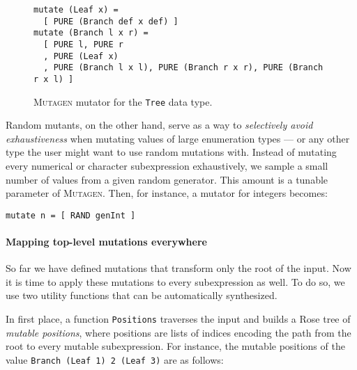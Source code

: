 \documentclass[sigconf, anonymous, review]{acmart}
\newcommand{\mutagen}{\textsc{Mutagen}\xspace}
\begin{document}
\begin{figure}[t]
\begin{verbatim}
mutate (Leaf x) =
  [ PURE (Branch def x def) ]
mutate (Branch l x r) =
  [ PURE l, PURE r
  , PURE (Leaf x)
  , PURE (Branch l x l), PURE (Branch r x r), PURE (Branch r x l) ]
\end{verbatim}
\vspace{-5pt}
\caption{\label{fig:mutagen:mutator}\mutagen mutator for the \texttt{Tree} data
  type.}
\vspace{-5pt}
\end{figure}

%
Random mutants, on the other hand, serve as a way to \emph{selectively avoid
  exhaustiveness} when mutating values of large enumeration types --- or any
other type the user might want to use random mutations with.
%
Instead of mutating every numerical or character subexpression exhaustively, we
sample a small number of values from a given random generator.
%
This amount is a tunable parameter of \mutagen.
%
Then, for instance, a mutator for integers becomes:

\begin{verbatim}
mutate n = [ RAND genInt ]
\end{verbatim}


\paragraph{Mapping top-level mutations everywhere}

So far we have defined mutations that transform only the root of the input.
%
Now it is time to apply these mutations to every subexpression as well.
%
To do so, we use two utility functions that can be automatically synthesized.

In first place, a function \texttt{Positions} traverses the input and builds a
Rose tree of \emph{mutable positions}, where positions are lists of indices
encoding the path from the root to every mutable subexpression.
%
%
%
%
For instance, the mutable positions of the value \texttt{Branch (Leaf 1) 2
  (Leaf 3)} are as follows:
\end{document}

